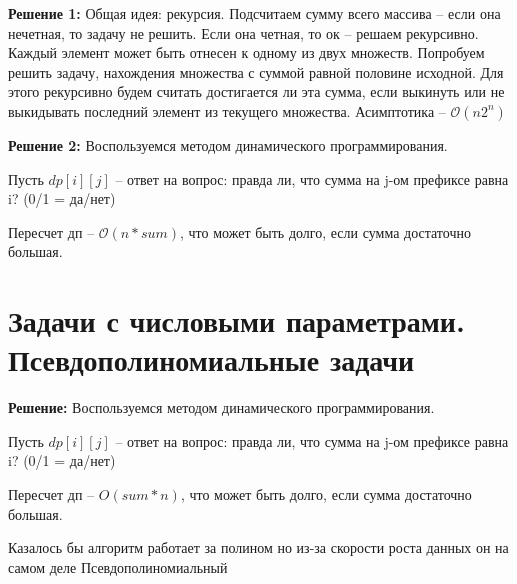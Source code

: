 \documentclass[40pt]{article}
\begin{document}
\par \textbf{Решение 1:} Общая идея: рекурсия. Подсчитаем сумму всего массива -- если она нечетная, то задачу не решить. Если она четная, то ок -- решаем рекурсивно. Каждый элемент может быть отнесен к одному из двух множеств. Попробуем решить задачу, нахождения множества с суммой равной половине исходной. Для этого рекурсивно будем считать достигается ли эта сумма, если выкинуть или не выкидывать последний элемент из текущего множества. Асимптотика -- $\mathcal O(n2^n)$
    \par \textbf{Решение 2:} Воспользуемся методом динамического программирования. 
    \par Пусть $dp[i][j]$ -- ответ на вопрос: правда ли, что сумма на j-ом префиксе равна i? (0/1 = да/нет)
    \par Пересчет дп -- $\mathcal O(n*sum )$, что может быть долго, если сумма достаточно большая.

\section{Задачи с числовыми параметрами. Псевдополиномиальные задачи}

 \par \textbf{Решение:} Воспользуемся методом динамического программирования. 
    \par Пусть $dp[i][j]$ -- ответ на вопрос: правда ли, что сумма на j-ом префиксе равна i? (0/1 = да/нет)
    \par Пересчет дп -- $O(sum * n)$, что может быть долго, если сумма достаточно большая.
 
    \par Казалось бы алгоритм работает за полином но из-за скорости роста данных он на самом деле Псевдополиномиальный
\end{document}
